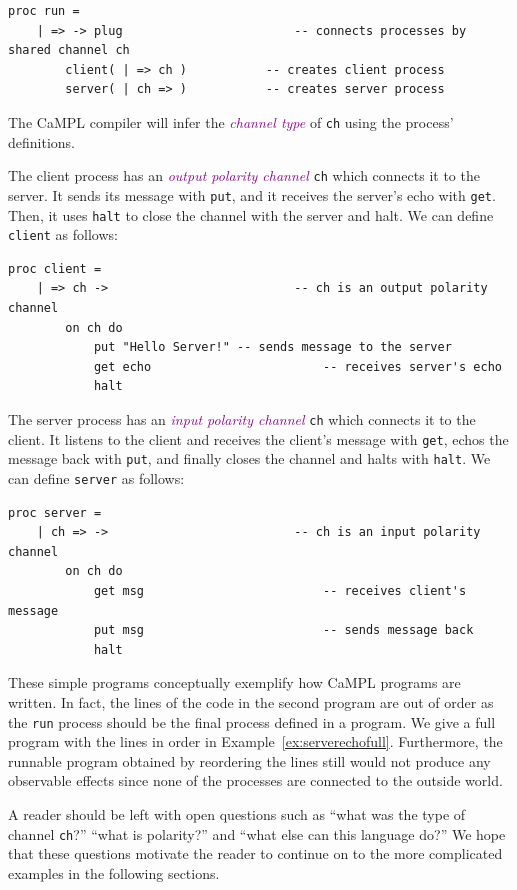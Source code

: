 \documentclass[acmsmall]{acmart}
\newcommand{\tc}[1]{\textcolor{darkMagenta}{\textit{#1}}}
\begin{document}
\begin{lstlisting}[label=ex:serverecho, caption=Server echos Client's message]
 proc run = 
 	| => -> plug						-- connects processes by shared channel ch
 		client( | => ch )			-- creates client process
 		server( | ch => )			-- creates server process
\end{lstlisting}
The CaMPL compiler will infer the \tc{channel type} of \lstinline$ch$ using the process' definitions. 

The client process has an \tc{output polarity channel} \lstinline$ch$ which connects it to the server.
It sends its message with \lstinline$put$, and it receives the server's echo with \lstinline$get$.
Then, it uses \lstinline$halt$ to close the channel with the server and halt.
We can define \lstinline$client$ as follows:
\begin{lstlisting}
proc client = 
	| => ch ->							-- ch is an output polarity channel
		on ch do 
			put "Hello Server!"	-- sends message to the server      
			get echo						-- receives server's echo  
			halt
\end{lstlisting}

The server process has an \tc{input polarity channel} \lstinline$ch$ which connects it to the client.
It listens to the client and receives the client's message with \lstinline$get$, echos the message back with \lstinline$put$, and finally closes the channel and halts with \lstinline$halt$.
We can define \lstinline$server$ as follows:
\begin{lstlisting}
proc server =  
	| ch => ->							-- ch is an input polarity channel
		on ch do
			get msg							-- receives client's message
			put msg							-- sends message back
			halt
\end{lstlisting}	

These simple programs conceptually exemplify how CaMPL programs are written.
In fact, the lines of the code in the second program are out of order as the \lstinline$run$ process should be the final process defined in a program.
We give a full program with the lines in order in Example~\ref{ex:serverechofull}.
Furthermore, the runnable program obtained by reordering the lines still would not produce any observable effects since none of the processes are connected to the outside world.

A reader should be left with open questions such as ``what was the type of channel \lstinline$ch$?'' ``what is polarity?'' and ``what else can this language do?''
We hope that these questions motivate the reader to continue on to the more complicated examples in the following sections.
\end{document}
